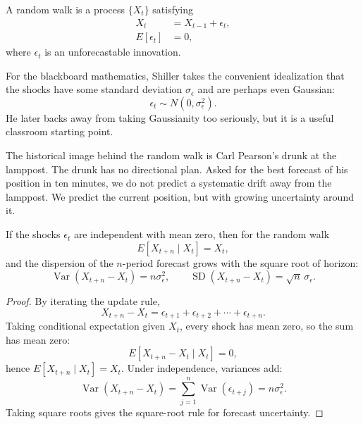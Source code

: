 \begin{definition}
A random walk is a process \(\{X_t\}\) satisfying
\begin{align}
X_t &= X_{t-1} + \epsilon_t, \\
E[\epsilon_t] &= 0,
\end{align}
where \(\epsilon_t\) is an unforecastable innovation.
\end{definition}

For the blackboard mathematics, Shiller takes the convenient idealization that the shocks have some standard deviation \(\sigma_\epsilon\) and are perhaps even Gaussian:
\begin{equation}
\epsilon_t \sim N(0,\sigma_\epsilon^2).
\end{equation}
He later backs away from taking Gaussianity too seriously, but it is a useful classroom starting point.

The historical image behind the random walk is Carl Pearson's drunk at the lamppost. The drunk has no directional plan. Asked for the best forecast of his position in ten minutes, we do not predict a systematic drift away from the lamppost. We predict the current position, but with growing uncertainty around it.

\begin{proposition}
If the shocks \(\epsilon_t\) are independent with mean zero, then for the random walk
\begin{equation}
E[X_{t+n}\mid X_t] = X_t,
\end{equation}
and the dispersion of the \(n\)-period forecast grows with the square root of horizon:
\begin{equation}
\operatorname{Var}(X_{t+n}-X_t) = n\sigma_\epsilon^2,
\qquad
\operatorname{SD}(X_{t+n}-X_t) = \sqrt{n}\,\sigma_\epsilon.
\end{equation}
\end{proposition}

\begin{proof}
By iterating the update rule,
\[
X_{t+n}-X_t = \epsilon_{t+1} + \epsilon_{t+2} + \cdots + \epsilon_{t+n}.
\]
Taking conditional expectation given \(X_t\), every shock has mean zero, so the sum has mean zero:
\[
E[X_{t+n}-X_t\mid X_t] = 0,
\]
hence \(E[X_{t+n}\mid X_t] = X_t\). Under independence, variances add:
\[
\operatorname{Var}(X_{t+n}-X_t) = \sum_{j=1}^{n} \operatorname{Var}(\epsilon_{t+j}) = n\sigma_\epsilon^2.
\]
Taking square roots gives the square-root rule for forecast uncertainty.
\end{proof}

